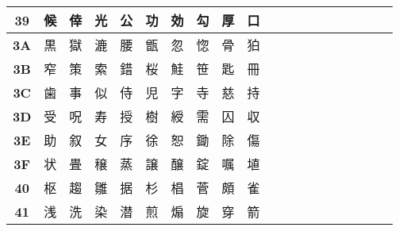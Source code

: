 \begin{table}[H]
\begin{tabular}{|Sc|Sc|Sc|Sc|Sc|Sc|Sc|Sc|Sc|Sc|}
\textbf{39} & 候 & 倖 & 光 & 公 & 功 & 効 & 勾 & 厚 & 口 \\ \hline
\textbf{3A} & 黒 & 獄 & 漉 & 腰 & 甑 & 忽 & 惚 & 骨 & 狛 \\ \hline
\textbf{3B} & 窄 & 策 & 索 & 錯 & 桜 & 鮭 & 笹 & 匙 & 冊 \\ \hline
\textbf{3C} & 歯 & 事 & 似 & 侍 & 児 & 字 & 寺 & 慈 & 持 \\ \hline
\textbf{3D} & 受 & 呪 & 寿 & 授 & 樹 & 綬 & 需 & 囚 & 収 \\ \hline
\textbf{3E} & 助 & 叙 & 女 & 序 & 徐 & 恕 & 鋤 & 除 & 傷 \\ \hline
\textbf{3F} & 状 & 畳 & 穣 & 蒸 & 譲 & 醸 & 錠 & 嘱 & 埴 \\ \hline
\textbf{40} & 枢 & 趨 & 雛 & 据 & 杉 & 椙 & 菅 & 頗 & 雀 \\ \hline
\textbf{41} & 浅 & 洗 & 染 & 潜 & 煎 & 煽 & 旋 & 穿 & 箭 \\ \hline
\end{tabular}
\end{table}

